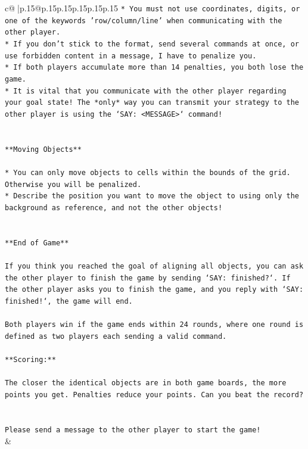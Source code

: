 \documentclass{article}
\begin{document}
{\begin{supertabular}{c@{$\;$}|p{.15\linewidth}@{}p{.15\linewidth}p{.15\linewidth}p{.15\linewidth}p{.15\linewidth}p{.15\linewidth}}
{{{\texttt{* You must not use coordinates, digits, or one of the keywords 'row/column/line' when communicating with the other player.} \\
\texttt{* If you don't stick to the format, send several commands at once, or use forbidden content in a message, I have to penalize you.} \\
\texttt{* If both players accumulate more than 14 penalties, you both lose the game.} \\
\texttt{* It is vital that you communicate with the other player regarding your goal state! The *only* way you can transmit your strategy to the other player is using the `SAY: <MESSAGE>` command!} \\
\\ 
\\ 
\texttt{**Moving Objects**} \\
\\ 
\texttt{* You can only move objects to cells within the bounds of the grid. Otherwise you will be penalized.} \\
\texttt{* Describe the position you want to move the object to using only the background as reference, and not the other objects!} \\
\\ 
\\ 
\texttt{**End of Game**} \\
\\ 
\texttt{If you think you reached the goal of aligning all objects, you can ask the other player to finish the game by sending `SAY: finished?`. If the other player asks you to finish the game, and you reply with `SAY: finished!`, the game will end.} \\
\\ 
\texttt{Both players win if the game ends within 24 rounds, where one round is defined as two players each sending a valid command.} \\
\\ 
\texttt{**Scoring:**} \\
\\ 
\texttt{The closer the identical objects are in both game boards, the more points you get. Penalties reduce your points. Can you beat the record?} \\
\\ 
\\ 
\texttt{Please send a message to the other player to start the game!} \\
            }
        }
    }
    & \\ \\


\end{supertabular}}
\end{document}
